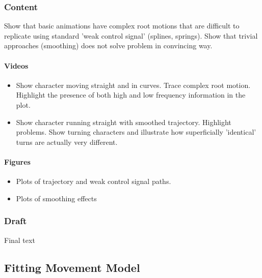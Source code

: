\subsubsection{Content}
Show that basic animations have complex root motions that are difficult to replicate using standard 'weak control signal' (splines, springs). 
Show that trivial approaches (smoothing) does not solve problem in convincing way.
\paragraph{Videos}
\begin{itemize}
    \item Show character moving straight and in curves. Trace complex root motion. Highlight the presence of both high and low frequency information in the plot.
    \item Show character running straight with smoothed trajectory. Highlight problems. Show turning characters and illustrate how superficially 'identical' turns are actually very different.
\end{itemize}
\paragraph{Figures}
\begin{itemize}
    \item Plots of trajectory and weak control signal paths.
    \item Plots of smoothing effects
\end{itemize}

\subsubsection{Draft}
Final text

\subsection{Fitting Movement Model}
